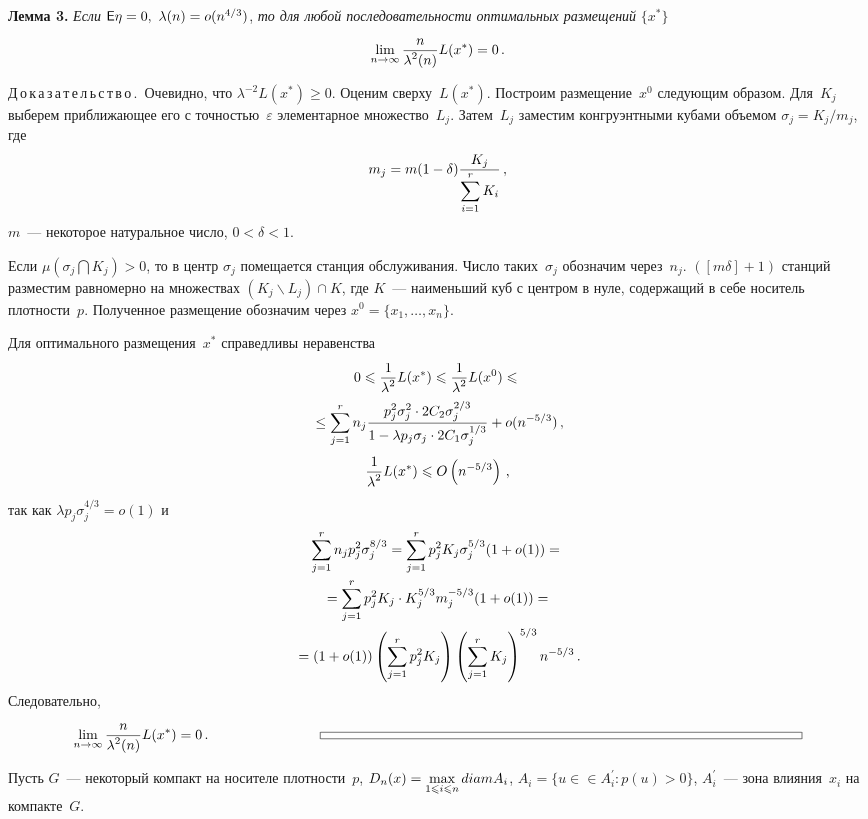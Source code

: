 \begin{multicols}{2}
\smallskip

\noindent
\textbf{Лемма 3.} \textit{Если} ${{\sf E}} \eta=0,~ \lambda(n)=o(n^{4/3})$, \textit{то для любой
последовательности оптимальных размещений} $\{x^*\}$
$$
\lim\limits_{n\rightarrow\infty}\displaystyle\frac{\displaystyle n\mathstrut}{\displaystyle \lambda^2(n)\mathstrut}L(x^*)=0\,.
$$


\noindent
Д\,о\,к\,а\,з\,а\,т\,е\,л\,ь\,с\,т\,в\,о\,.\ 
Очевидно, что $\lambda^{-2} L(x^*) \geqslant 0$. Оценим сверху~$L(x^*)$. 
Построим размещение~$x^0$ следующим образом. Для~$K_j$ выберем при\-бли\-жа\-ющее его с точностью~$\varepsilon$ 
элементарное множество~$L_j$. Затем~$L_j$ заместим конгруэнтными кубами
объемом $\sigma_j=K_j/m_j$, где
$$
m_j=m(1-\delta) \displaystyle\frac{\displaystyle K_j\mathstrut}{\displaystyle \sum\limits_{i=1}^{r}K_i\mathstrut}\,,
$$
$m$~--- некоторое натуральное число, $0<\delta<1$.
\pagebreak

Если $\mu(\sigma_j \bigcap K_j)>0$, то в центр $\sigma_j$ помещается
станция обслуживания. Число таких~$\sigma_j$ обозначим через~$n_j$.
$([m\delta]+1)$ станций разместим равномерно на множествах
$(K_j\backslash L_j)\cap K$, где $K$~--- наименьший куб с центром в
нуле, содержащий в себе носитель плотности~$p$. Полученное
размещение обозначим через $x^0=\{x_1,\ldots,x_n \}$.

Для оптимального размещения~$x^*$ справедливы неравенства
\begin{multline*}
0\leqslant\displaystyle\frac{\displaystyle 1\mathstrut}{\displaystyle \lambda^2\mathstrut}L(x^*)\leqslant \displaystyle\frac{\displaystyle 1\mathstrut}{\displaystyle \lambda^2\mathstrut} L(x^0)\leqslant {}\\
{}\leq
\sum\limits_{j=1}^{r}n_j \displaystyle\frac{\displaystyle p_j^2 \sigma_j^2 \cdot
2 C_2 \sigma_j^{2/3}\mathstrut}{\displaystyle 1-\lambda p_j \sigma_j \cdot 2 C_1 \sigma_j^{1/3}\mathstrut} + o(n^{-5/3})\,,
\end{multline*}
$$
\displaystyle\frac{\displaystyle 1\mathstrut}{\displaystyle \lambda^2\mathstrut}L(x^*)\leqslant O\left(n^{-5/3}\right)\,,
$$
так как $\lambda p_j \sigma_j^{4/3}=o(1)$ и
\begin{multline*}
\sum\limits_{j=1}^{r}n_j p_j^2 \sigma_j^{8/3}=\sum\limits_{j=1}^{r}p_j^2 K_j \sigma_j^{5/3}(1+o(1))={}\\
{}=\sum\limits_{j=1}^{r}p_j^2 K_j \cdot
K_j^{5/3} m_j^{-5/3}(1+o(1))={}\\
{}
=(1+o(1))\left(\sum\limits_{j=1}^{r}p_j^2 K_j\right)\left(\sum\limits_{j=1}^{r} K_j\right)^{5/3}
n^{-5/3}\,.
\end{multline*}
Следовательно,
$$
\limn\fr{n}{\lambda^2(n)}L(x^*)=0\,. \qquad\qquad\qquad\qquad  \sqq
$$

\smallskip


Пусть $G$~--- некоторый компакт на носителе плотности~$p$,
$D_n(x)=\max\limits_{1\leqslant i\leqslant n}diam A_i$, $A_i=\{u\in$\linebreak $\in A_i^{'} : p(u)>0 \}$, $A_i^{'}$~--- 
зона влияния~$x_i$ на компакте~$G$.


\end{multicols}

